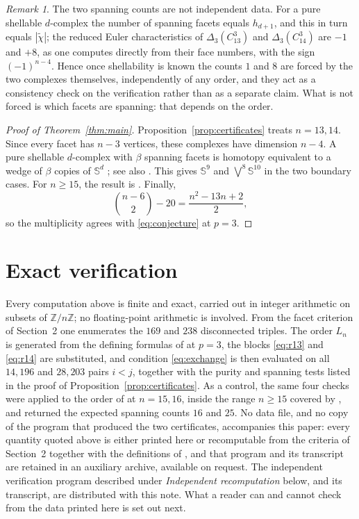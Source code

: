\documentclass[11pt]{amsart}
\theoremstyle{remark}
\newtheorem{remark}[theorem]{Remark}
\newcommand{\Z}{\mathbb Z}
\newcommand{\Sph}{\mathbb S}
\begin{document}
\begin{remark}\label{rem:forced}
The two spanning counts are not independent data.  For a pure shellable
$d$-complex the number of spanning facets equals $h_{d+1}$, and this in turn
equals $|\widetilde\chi|$; the reduced Euler characteristics of
$\Delta_3(C_{13}^3)$ and $\Delta_3(C_{14}^3)$ are $-1$ and $+8$, as one
computes directly from their face numbers, with the sign $(-1)^{n-4}$.  Hence
once shellability is known the counts $1$ and $8$ are forced by the two
complexes themselves, independently of any order, and they act as a
consistency check on the verification rather than as a separate claim.  What
is not forced is which facets are spanning: that depends on the order.
\end{remark}

\begin{proof}[Proof of Theorem~\ref{thm:main}]
Proposition~\ref{prop:certificates} treats $n=13,14$.  Since every facet has
$n-3$ vertices, these complexes have dimension $n-4$.  A pure shellable
$d$-complex with $\beta$ spanning facets is homotopy equivalent to a wedge of
$\beta$ copies of $\Sph^d$ \cite[Theorem~12.3]{Kozlov}; see also
\cite[Theorem~2.3]{CS}.  This gives $\Sph^9$ and
$\bigvee^8\Sph^{10}$ in the two boundary cases.  For $n\ge15$, the result is
\cite[Theorem~1.4]{CS}.  Finally,
\[
  \binom{n-6}{2}-20=\frac{n^2-13n+2}{2},
\]
so the multiplicity agrees with \eqref{eq:conjecture} at $p=3$.
\end{proof}

\section*{Exact verification}

Every computation above is finite and exact, carried out in integer
arithmetic on subsets of $\Z/n\Z$; no floating-point arithmetic is involved.
From the facet criterion of Section~2 one enumerates the $169$ and $238$
disconnected triples.  The order $L_n$ is generated from the defining
formulas of \cite[Section~3]{CS} at $p=3$, the blocks \eqref{eq:r13} and
\eqref{eq:r14} are substituted, and condition \eqref{eq:exchange} is then
evaluated on all $14{,}196$ and $28{,}203$ pairs $i<j$, together with the
purity and spanning tests listed in the proof of
Proposition~\ref{prop:certificates}.  As a control, the same four checks were
applied to the order of \cite[Section~3]{CS} at $n=15,16$, inside the range
$n\ge15$ covered by \cite[Theorem~1.4]{CS}, and returned the expected spanning
counts $16$ and $25$.  No data file, and no copy of the program that produced
the two certificates, accompanies this paper: every
quantity quoted above is either printed here or recomputable from the criteria
of Section~2 together with the definitions of \cite[Section~3]{CS}, and that
program and its transcript are retained in an auxiliary archive,
available on request.  The independent verification program described under
\emph{Independent recomputation} below, and its transcript, are distributed
with this note.  What a reader can and cannot check from the data
printed here is set out next.
\end{document}
